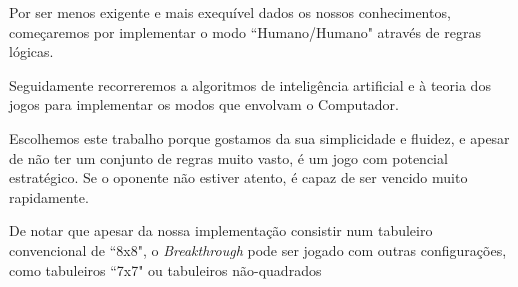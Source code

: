 \documentclass[15pt,a4paper]{article}
\begin{document}
Por ser menos exigente e mais exequível dados os nossos conhecimentos, começaremos por implementar o modo ``Humano/Humano" através de regras lógicas.

Seguidamente recorreremos a algoritmos de inteligência artificial e à teoria dos jogos para implementar os modos que envolvam o Computador.


Escolhemos este trabalho porque gostamos da sua simplicidade e fluidez, e apesar de não ter um conjunto de regras muito vasto, é um jogo com potencial estratégico. 
Se o oponente não estiver atento, é capaz de ser vencido muito rapidamente.

De notar que apesar da nossa implementação consistir num tabuleiro convencional de ``8x8", o \textit{Breakthrough} pode ser jogado com outras configurações, como tabuleiros ``7x7" ou tabuleiros não-quadrados












\end{document}
